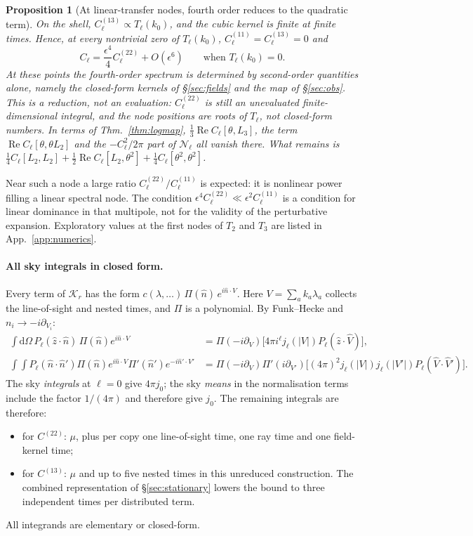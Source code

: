 \documentclass[11pt]{article}
\newtheorem{proposition}[theorem]{Proposition}
\theoremstyle{definition}
\theoremstyle{remark}
\newcommand{\eps}{\epsilon}
\newcommand{\nh}{\hat n}
\newcommand{\dd}{\mathrm{d}}
\begin{document}
\begin{proposition}[At linear-transfer nodes, fourth order reduces to the quadratic term]\label{prop:nodes}
On the shell, $C^{(13)}_\ell\propto T_\ell(k_0)$, and the cubic kernel is finite at finite
times. Hence, at every nontrivial zero of $T_\ell(k_0)$, $C^{(11)}_\ell=C^{(13)}_\ell=0$ and
\[
\boxed{C_\ell=\frac{\eps^4}{4}C^{(22)}_\ell+O(\eps^6)\qquad\text{when }T_\ell(k_0)=0 .}
\]
At these points the fourth-order spectrum is determined by second-order quantities alone,
namely the closed-form kernels of \S\ref{sec:fields} and the map of \S\ref{sec:obs}. This is a
reduction, not an evaluation: $C^{(22)}_\ell$ is still an unevaluated finite-dimensional
integral, and the node positions are roots of $T_\ell$, not closed-form numbers. In
terms of Thm.~\ref{thm:logmap}, $\frac13\operatorname{Re}C_\ell[\theta,L_3]$, the term
$\operatorname{Re}C_\ell[\theta,\theta L_2]$ and the $-C_\ell^2/2\pi$ part of $\mathcal N_\ell$
all vanish there. What remains is
$\frac14C_\ell[L_2,L_2]+\frac12\operatorname{Re}C_\ell[L_2,\theta^2]+\frac14C_\ell[\theta^2,\theta^2]$.
\end{proposition}
Near such a node a large ratio $C^{(22)}_\ell/C^{(11)}_\ell$ is expected: it is nonlinear power
filling a linear spectral node. The condition $\eps^4C^{(22)}_\ell\ll\eps^2C^{(11)}_\ell$ is a
condition for linear dominance in that multipole, not for the validity of the perturbative
expansion. Exploratory values at the first nodes of $T_2$ and $T_3$ are listed in
App.~\ref{app:numerics}.

\paragraph{All sky integrals in closed form.} Every term of $\mathcal K_r$ has the form
$c(\lambda,\ldots)\,\Pi(\nh)\,e^{i\nh\cdot V}$. Here $V=\sum_ak_a\lambda_a$ collects the
line-of-sight and nested times, and $\Pi$ is a polynomial. By Funk--Hecke and
$n_i\to-i\partial_{V_i}$:
\begin{align*}
\int\dd\Omega\,P_\ell(\hat z\cdot\nh)\,\Pi(\nh)e^{i\nh\cdot V}&=\Pi(-i\partial_V)\big[4\pi i^\ell j_\ell(|V|)P_\ell(\hat z\cdot\hat V)\big],\\
\int\!\!\int P_\ell(\nh\cdot\nh')\Pi(\nh)e^{i\nh\cdot V}\Pi'(\nh')e^{-i\nh'\cdot V'}&=\Pi(-i\partial_V)\Pi'(i\partial_{V'})\big[(4\pi)^2j_\ell(|V|)j_\ell(|V'|)P_\ell(\hat V\cdot\hat V')\big].
\end{align*}
The sky \emph{integrals} at $\ell=0$ give $4\pi j_0$; the sky \emph{means} in the
normalisation terms include the factor $1/(4\pi)$ and therefore give $j_0$.
The remaining integrals are therefore:
\begin{itemize}
\item for $C^{(22)}$: $\mu$, plus per copy one line-of-sight time, one ray time and one
  field-kernel time;
\item for $C^{(13)}$: $\mu$ and up to five nested times in this unreduced construction.
  The combined representation of \S\ref{sec:stationary} lowers the bound to three independent
  times per distributed term.
\end{itemize}
All integrands are elementary or closed-form.
\end{document}
